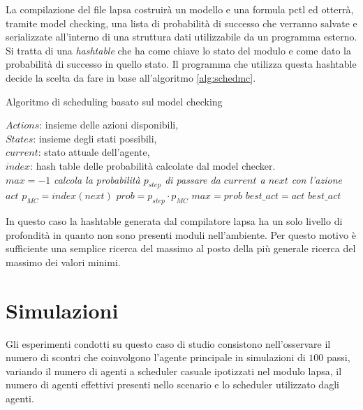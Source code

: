 La compilazione del file \ac{lapsa} costruirà un modello \prism{} e una formula \ac{pctl} ed otterrà, tramite model checking, una lista di probabilità di successo che verranno salvate e serializzate all'interno di una struttura dati utilizzabile da un programma \java{} esterno. Si tratta di una \emph{hashtable} che ha come chiave lo stato del modulo e come dato la probabilità di successo in quello stato. Il programma \java{} che utilizza questa hashtable decide la scelta da fare in base all'algoritmo \ref{alg:schedmc}.
\begin{algorithm}
	\caption{Algoritmo di scheduling basato sul model checking}
	\label{alg:schedmc}
	\begin{algorithmic}
		\REQUIRE
			$Actions$: insieme delle azioni disponibili, \\
			$States$: insieme degli stati possibili, \\
			$current$: stato attuale dell'agente, \\
			$index$: hash table delle probabilità calcolate dal model checker. \\
		\STATE $max = -1$
				\STATE \emph{calcola la probabilità $p_{step}$ di passare da $current$ a $next$ con l'azione $act$}
				\STATE $p_{MC} = index(next)$
				\STATE $prob = p_{step}\cdot p_{MC}$
					\STATE $max = prob$
					\STATE $best\_act = act$
				\ENDIF
			\ENDFOR
		\ENDFOR
		\RETURN $best\_act$
	\end{algorithmic}
\end{algorithm}
In questo caso la hashtable generata dal compilatore \ac{lapsa} ha un solo livello di profondità in quanto non sono presenti moduli nell'ambiente. Per questo motivo è sufficiente una semplice ricerca del massimo al posto della più generale ricerca del massimo dei valori minimi.

\section{Simulazioni}
Gli esperimenti condotti su questo caso di studio consistono nell'osservare il numero di scontri che coinvolgono l'agente principale in simulazioni di $100$ passi, variando il numero di agenti a scheduler casuale ipotizzati nel modulo \ac{lapsa}, il numero di agenti effettivi presenti nello scenario e lo scheduler utilizzato dagli agenti.

